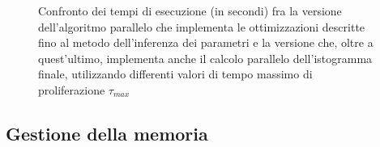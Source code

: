 \begin{figure}[t]
    \centering
    \caption{Confronto dei tempi di esecuzione (in secondi) fra la versione 
    dell'algoritmo parallelo che implementa le ottimizzazioni descritte fino al
    metodo dell'inferenza dei parametri
    e la versione che, oltre a quest'ultimo, implementa anche il calcolo 
    parallelo dell'istogramma finale,
    utilizzando differenti valori di tempo massimo di proliferazione
    $\tau_{max}$}
    \label{chart:inference-histogram}
\end{figure}

\newpage

\subsection{Gestione della memoria}

